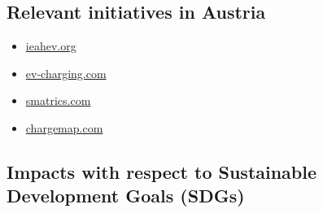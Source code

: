 \documentclass[
]{book}
\providecommand{\tightlist}{%
  \setlength{\itemsep}{0pt}\setlength{\parskip}{0pt}}
\begin{document}
\hypertarget{relevant-initiatives-in-austria-5}{%
\subsection*{Relevant initiatives in Austria}\label{relevant-initiatives-in-austria-5}}

\begin{itemize}
\tightlist
\item
  \href{http://www.ieahev.org/by-country/austria-charging-infrastructure/}{ieahev.org}
\item
  \href{https://ev-charging.com/at/en/elektrotankstellen}{ev-charging.com}
\item
  \href{https://smatrics.com/en/charging-network}{smatrics.com}
\item
  \href{https://chargemap.com/cities/wien-AT}{chargemap.com}
\end{itemize}

\hypertarget{impacts-with-respect-to-sustainable-development-goals-sdgs-5}{%
\subsection*{Impacts with respect to Sustainable Development Goals (SDGs)}\label{impacts-with-respect-to-sustainable-development-goals-sdgs-5}}
\end{document}

